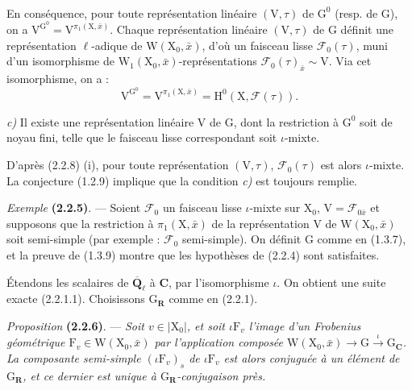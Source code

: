 \documentclass[11pt,leqno]{article}
\newcommand{\Page}[1]{\ifvmode\noindent\else\unskip\ \fi{\footnotesize\textcolor{gray}{[p.\,#1]}}\ \ignorespaces}
\begin{document}
\Page{194}

En conséquence, pour toute représentation linéaire \((\mathrm V,\tau)\) de \(\mathrm G^0\) (resp. de \(\mathrm G\)), on a \(\mathrm V^{\mathrm G^0}=\mathrm V^{\pi_1(\mathrm X,\bar{x})}\). Chaque représentation linéaire \((\mathrm V,\tau)\) de \(\mathrm G\) définit une représentation \(\ell\)-adique de \(\mathrm W(\mathrm X_0,\bar{x})\), d’où un faisceau lisse \(\mathscr F_0(\tau)\), muni d’un isomorphisme de \(\mathrm W_1(\mathrm X_0,\bar{x})\)-représentations \(\mathscr F_0(\tau)_{\bar{x}}\sim\mathrm V\). Via cet isomorphisme, on a :
\[
\mathrm V^{\mathrm G^0}
=\mathrm V^{\pi_1(\mathrm X,\bar{x})}
=\mathrm H^0(\mathrm X,\mathscr F(\tau)).
\]

\textit{c)} Il existe une représentation linéaire \(\mathrm V\) de \(\mathrm G\), dont la restriction à \(\mathrm G^0\) soit de noyau fini, telle que le faisceau lisse correspondant soit \(\iota\)-mixte.

D’après (2.2.8) (i), pour toute représentation \((\mathrm V,\tau)\), \(\mathscr F_0(\tau)\) est alors \(\iota\)-mixte. La conjecture (1.2.9) implique que la condition \textit{c)} est toujours remplie.

\textit{Exemple} \textbf{(2.2.5)}. — Soient \(\mathscr F_0\) un faisceau lisse \(\iota\)-mixte sur \(\mathrm X_0\), \(\mathrm V=\mathscr F_{0\bar{x}}\) et supposons que la restriction à \(\pi_1(\mathrm X,\bar{x})\) de la représentation \(\mathrm V\) de \(\mathrm W(\mathrm X_0,\bar{x})\) soit semi-simple (par exemple : \(\mathscr F_0\) semi-simple). On définit \(\mathrm G\) comme en (1.3.7), et la preuve de (1.3.9) montre que les hypothèses de (2.2.4) sont satisfaites.

Étendons les scalaires de \(\overline{\mathbf Q}_\ell\) à \(\mathbf C\), par l’isomorphisme \(\iota\). On obtient une suite exacte (2.2.1.1). Choisissons \(\mathrm G_{\mathbf R}\) comme en (2.2.1).

\textit{Proposition} \textbf{(2.2.6)}. — \textit{Soit \(v\in|\mathrm X_0|\), et soit \(\iota\mathrm F_v\) l’image d’un Frobenius géométrique \(\mathrm F_v\in\mathrm W(\mathrm X_0,\bar{x})\) par l’application composée \(\mathrm W(\mathrm X_0,\bar{x})\to\mathrm G\xrightarrow{\iota}\mathrm G_{\mathbf C}\). La composante semi-simple \((\iota\mathrm F_v)_s\) de \(\iota\mathrm F_v\) est alors conjuguée à un élément de \(\mathrm G_{\mathbf R}\), et ce dernier est unique à \(\mathrm G_{\mathbf R}\)-conjugaison près.}
\end{document}

